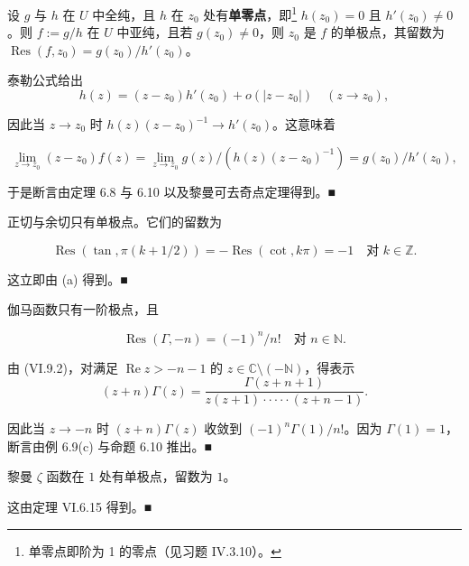 \begin{example}

\begin{items}
\item

设 $ g $ 与 $ h $ 在 $ U $ 中全纯，且 $ h $ 在 $ z_{0} $ 处有\textbf{单零点}，即\footnote{单零点即阶为 1 的零点（见习题 IV.3.10）。} $ h(z_{0}) = 0 $ 且 $ h'(z_{0}) \ne 0 $。则 $ f := g/h $ 在 $ U $ 中亚纯，且若 $ g(z_{0}) \ne 0 $，则 $ z_{0} $ 是 $ f $ 的单极点，其留数为 $ \operatorname{Res}(f,z_{0}) = g(z_{0})/h'(z_{0}) $。

\proofhead
泰勒公式给出
\[
h(z) = (z - z_{0})h'(z_{0}) + o(|z - z_{0}|) \quad (z \to z_{0}) ,
\]

因此当 $ z \to z_{0} $ 时 $ h(z)(z - z_{0})^{-1} \to h'(z_{0}) $。这意味着

\[
\lim_{z\to z_{0}}(z - z_{0})f(z) = \lim_{z\to z_{0}}g(z)/\left(h(z)(z - z_{0})^{-1}\right) = g(z_{0})/h'(z_{0}) ,
\]

于是断言由定理 6.8 与 6.10 以及黎曼可去奇点定理得到。\nobreak\hspace{0.35em}■

\item

正切与余切只有单极点。它们的留数为

\[
\operatorname{Res}\left(\tan,\pi(k + 1/2)\right) = -\operatorname{Res}(\cot,k\pi) = -1 \quad \text{对 } k \in \mathbb{Z} .
\]

\proofhead
这立即由 (a) 得到。\nobreak\hspace{0.35em}■
\item

伽马函数只有一阶极点，且

\[
\operatorname{Res}(\Gamma,-n) = (-1)^{n}/n! \quad \text{对 } n \in \mathbb{N} .
\]

\proofhead
由 (VI.9.2)，对满足 $ \operatorname{Re} z > -n - 1 $ 的 $ z \in \mathbb{C}\setminus(-\mathbb{N}) $，得表示
\[
(z + n)\Gamma(z) = \frac{\Gamma(z + n + 1)}{z(z + 1)\cdot\cdot\cdot\cdot\cdot(z + n - 1)} .
\]

因此当 $ z \to -n $ 时 $ (z + n)\Gamma(z) $ 收敛到 $ (-1)^{n}\Gamma(1)/n! $。因为 $ \Gamma(1) = 1 $，断言由例 6.9(c) 与命题 6.10 推出。\nobreak\hspace{0.35em}■

\item

黎曼 $ \zeta $ 函数在 $ 1 $ 处有单极点，留数为 $ 1 $。

\proofhead
这由定理 VI.6.15 得到。\nobreak\hspace{0.35em}■
\item


\end{items}
\end{example}
